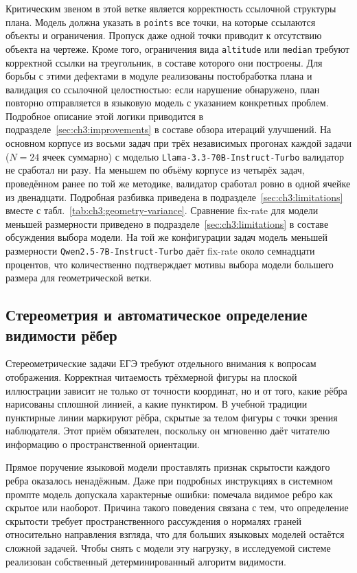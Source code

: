 Критическим звеном в этой ветке является корректность ссылочной структуры плана. Модель должна указать в \texttt{points} все точки, на которые ссылаются объекты и ограничения. Пропуск даже одной точки приводит к отсутствию объекта на чертеже. Кроме того, ограничения вида \texttt{altitude} или \texttt{median} требуют корректной ссылки на треугольник, в составе которого они построены. Для борьбы с этими дефектами в модуле реализованы постобработка плана и валидация со ссылочной целостностью: если нарушение обнаружено, план повторно отправляется в языковую модель с указанием конкретных проблем. Подробное описание этой логики приводится в подразделе~\ref{sec:ch3:improvements} в составе обзора итераций улучшений. На основном корпусе из восьми задач при трёх независимых прогонах каждой задачи (\(N = 24\) ячеек суммарно) с моделью \texttt{Llama-3.3-70B-Instruct-Turbo} валидатор не сработал ни разу. На меньшем по объёму корпусе из четырёх задач, проведённом ранее по той же методике, валидатор сработал ровно в одной ячейке из двенадцати. Подробная разбивка приведена в подразделе~\ref{sec:ch3:limitations} вместе с табл.~\ref{tab:ch3:geometry-variance}. Сравнение fix-rate для модели меньшей размерности приведено в подразделе~\ref{sec:ch3:limitations} в составе обсуждения выбора модели. На той же конфигурации задач модель меньшей размерности \texttt{Qwen2.5-7B-Instruct-Turbo} даёт fix-rate около семнадцати процентов, что количественно подтверждает мотивы выбора модели большего размера для геометрической ветки.

\subsection{Стереометрия и автоматическое определение видимости рёбер}
\label{sec:ch3:visibility}

Стереометрические задачи ЕГЭ требуют отдельного внимания к вопросам отображения. Корректная читаемость трёхмерной фигуры на плоской иллюстрации зависит не только от точности координат, но и от того, какие рёбра нарисованы сплошной линией, а какие пунктиром. В учебной традиции пунктирные линии маркируют рёбра, скрытые за телом фигуры с точки зрения наблюдателя. Этот приём обязателен, поскольку он мгновенно даёт читателю информацию о пространственной ориентации.

Прямое поручение языковой модели проставлять признак скрытости каждого ребра оказалось ненадёжным. Даже при подробных инструкциях в системном промпте модель допускала характерные ошибки: помечала видимое ребро как скрытое или наоборот. Причина такого поведения связана с тем, что определение скрытости требует пространственного рассуждения о нормалях граней относительно направления взгляда, что для больших языковых моделей остаётся сложной задачей. Чтобы снять с модели эту нагрузку, в исследуемой системе реализован собственный детерминированный алгоритм видимости.

